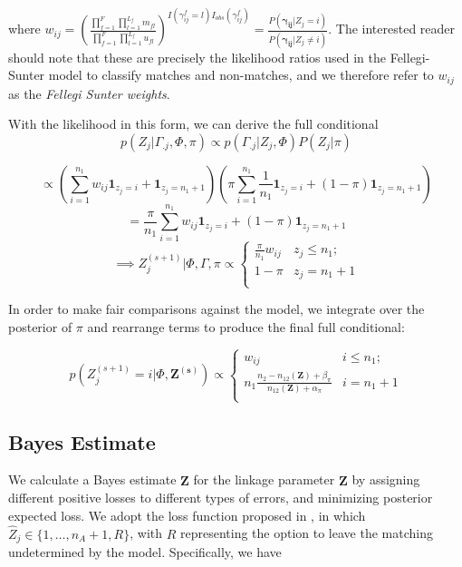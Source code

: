\documentclass[12pt,letterpaper]{article}
\newcommand{\1}[1]{\mathbb{I}\!\left[#1\right]} %
\begin{document}
where
$w_{ij} = \left(\frac{\prod_{f=1}^{F}\prod_{l=1}^{L_f} m_{fl}}{\prod_{f=1}^{F}\prod_{l=1}^{L_f} u_{fl}}\right)^{I(\gamma_{ij}^f = l)I_{obs}(\gamma_{ij}^f)} = \frac{P(\boldsymbol{\gamma_{ij}}|Z_j = i)}{P(\boldsymbol{\gamma_{ij}} |Z_j \neq i)}$.
The interested reader should note that these are precisely the
likelihood ratios used in the Fellegi-Sunter model to classify matches
and non-matches, and we therefore refer to \(w_{ij}\) as the
\emph{Fellegi Sunter weights}.

With the likelihood in this form, we can derive the full conditional
\[p(Z_j|\Gamma_{.j}, \Phi, \pi) \propto p(\Gamma_{.j}| Z_j, \Phi) P(Z_j|\pi)\]

\[\propto \left(\sum_{i=1}^{n_1}w_{ij}\mathbf{1}_{z_j = i} + \mathbf{1}_{z_j = n_1 + 1}\right)\left(\pi\sum_{i=1}^{n_1}\frac{1}{n_1}\mathbf{1}_{z_j = i} + (1-\pi)\mathbf{1}_{z_j = n_1 + 1}\right)\]
\[= \frac{\pi}{n_1}\sum_{i=1}^{n_1}w_{ij}\mathbf{1}_{z_j = i} + (1-\pi)\mathbf{1}_{z_j = n_1 + 1} \]
\[ \implies Z_j^{(s+1)} | \Phi, \Gamma, \pi \propto
\begin{cases} 
	\frac{\pi}{n_1}w_{ij}   & z_j \leq n_1; \\
	1-\pi &  z_j  = n_1 + 1 \\
\end{cases}\]

In order to make fair comparisons against the \citep{sadinle_bayesian_2017} model, we
integrate over the posterior of \(\pi\) and rearrange terms to
produce the final full conditional:

\[p\left(Z_j^{(s+1)}  = i| \Phi, \mathbf{Z^{(s)}}\right) \propto
\begin{cases} 
	w_{ij}  & i \leq n_1; \\
	n_1 \frac{n_2 - n_{12}(\mathbf{Z}) + \beta_{\pi}}{n_{12}(\mathbf{Z}) + \alpha_{\pi}} & i  = n_1 + 1 \\
\end{cases}\]

\hypertarget{bayes-estimate}{%
	\subsection{Bayes Estimate}
	\label{bayes-estimate}}

We calculate a Bayes estimate \(\hat{\mathbf{Z}}\) for the linkage
parameter \(\mathbf{Z}\) by assigning different positive losses to
different types of errors, and minimizing posterior expected loss. We
adopt the loss function proposed in \cite{sadinle_bayesian_2017}, in which
\(\hat{Z}_j \in \{1, \ldots, n_A + 1, R\}\), with \(R\) representing the
option to leave the matching undetermined by the model. Specifically, we have
\end{document}
